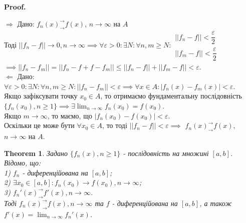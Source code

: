 \documentclass[a4paper, 10pt]{article}
\makeatletter
\def\huge{\displaystyle}
\def\qed{$\blacksquare$}
\def\rightproof{$\boxed{\Rightarrow}$ }
\def\leftproof{$\boxed{\Leftarrow}$ }
\theoremstyle{theoremdd}
\newtheorem{theorem}{Theorem}[subsection]
\theoremstyle{theoremdd}
\theoremstyle{theoremdd}
\theoremstyle{theoremdd}
\theoremstyle{theoremdd}
\theoremstyle{theoremdd}
\theoremstyle{theoremdd}
\theoremstyle{theoremdd}
\renewenvironment{proof}[1][Proof.\\]{\par
\pushQED{\hfill \qed}%
\normalfont \topsep6\p@\@plus6\p@\relax
\trivlist
\item\relax
{\bfseries
#1\@addpunct{.}}\hspace\labelsep\ignorespaces
}{%
\popQED\endtrivlist\@endpefalse
}
\makeatother
\begin{document}
\begin{proof}
\rightproof Дано: $f_n(x)^\rightarrow_\rightarrow f(x)$, $n \to \infty$ на $A$\\
Тоді $||f_n - f|| \to 0, n \to \infty \implies \forall \varepsilon > 0: \exists N: \forall n,m \geq N: \begin{gathered} ||f_n-f|| < \dfrac{\varepsilon}{2} \\ ||f_m-f|| < \dfrac{\varepsilon}{2} \end{gathered}$\\
$\implies ||f_n - f_m|| = ||f_n - f + f - f_m|| \leq ||f_n - f|| + ||f_m - f|| < \varepsilon$.
\bigskip \\
\leftproof Дано: $\forall \varepsilon > 0: \exists N: \forall n,m \geq N: ||f_n - f_m|| < \varepsilon \implies \forall x \in A: |f_n(x) - f_m(x)| < \varepsilon$.\\
Якщо зафіксувати точку $x_0 \in A$, то отримаємо фундаментальну послідовність $\{f_n(x_0), n \geq 1\} \implies \exists \huge \lim_{n \to \infty} f_n(x_0) = f(x_0)$.\\
Якщо $m \to \infty$, то маємо, що $|f_n(x_0) - f(x_0)| < \varepsilon$.\\
Оскільки це може бути $\forall x_0 \in A$, то тоді $||f_n - f|| < \varepsilon \implies$ $f_n(x)^\rightarrow_\rightarrow f(x)$, $n \to \infty$ на $A$.
\end{proof}


\iffalse
\begin{theorem}
Задано $\{f_n(x), n \geq 1\}$ - послідовність на множині $[a,b]$. Відомо, що:\\
1) $f_n$ - диференційована на $[a,b]$;\\
2) $\exists x_0 \in [a,b]: f_n(x_0) \to f(x_0), n \to \infty$;\\
3) $f_n'(x)^\rightarrow_\rightarrow f'(x), n \to \infty$.\\
Тоді $f_n(x)^\rightarrow_\rightarrow f(x), n \to \infty$ та $f$ - диференційована на $[a,b]$, а також $f'(x) = \huge\lim_{n \to \infty} f_n'(x)$.
\end{theorem}
\end{document}
